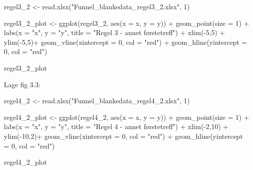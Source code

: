 \documentclass[
]{book}
\newenvironment{Shaded}{\begin{snugshade}}{\end{snugshade}}
\newcommand{\AttributeTok}[1]{\textcolor[rgb]{0.77,0.63,0.00}{#1}}
\newcommand{\DecValTok}[1]{\textcolor[rgb]{0.00,0.00,0.81}{#1}}
\newcommand{\FunctionTok}[1]{\textcolor[rgb]{0.00,0.00,0.00}{#1}}
\newcommand{\NormalTok}[1]{#1}
\newcommand{\OtherTok}[1]{\textcolor[rgb]{0.56,0.35,0.01}{#1}}
\newcommand{\SpecialCharTok}[1]{\textcolor[rgb]{0.00,0.00,0.00}{#1}}
\newcommand{\StringTok}[1]{\textcolor[rgb]{0.31,0.60,0.02}{#1}}
\begin{document}
\begin{Shaded}
\begin{Highlighting}[]
\NormalTok{regel3\_2 }\OtherTok{\textless{}{-}} \FunctionTok{read.xlsx}\NormalTok{(}\StringTok{"Funnel\_blankedata\_regel3\_2.xlsx"}\NormalTok{, }\DecValTok{1}\NormalTok{)}

\NormalTok{regel3\_2\_plot }\OtherTok{\textless{}{-}} \FunctionTok{ggplot}\NormalTok{(regel3\_2, }\FunctionTok{aes}\NormalTok{(}\AttributeTok{x =}\NormalTok{ x, }\AttributeTok{y =}\NormalTok{ y)) }\SpecialCharTok{+}
  \FunctionTok{geom\_point}\NormalTok{(}\AttributeTok{size =} \DecValTok{1}\NormalTok{) }\SpecialCharTok{+} \FunctionTok{labs}\NormalTok{(}\AttributeTok{x =} \StringTok{"x"}\NormalTok{, }\AttributeTok{y =} \StringTok{"y"}\NormalTok{, }\AttributeTok{title =} \StringTok{"Regel 3 {-} annet førstetreff"}\NormalTok{) }\SpecialCharTok{+} \FunctionTok{xlim}\NormalTok{(}\SpecialCharTok{{-}}\DecValTok{5}\NormalTok{,}\DecValTok{5}\NormalTok{) }\SpecialCharTok{+} \FunctionTok{ylim}\NormalTok{(}\SpecialCharTok{{-}}\DecValTok{5}\NormalTok{,}\DecValTok{5}\NormalTok{)}\SpecialCharTok{+} \FunctionTok{geom\_vline}\NormalTok{(}\AttributeTok{xintercept =} \DecValTok{0}\NormalTok{, }\AttributeTok{col =} \StringTok{"red"}\NormalTok{) }\SpecialCharTok{+} \FunctionTok{geom\_hline}\NormalTok{(}\AttributeTok{yintercept =} \DecValTok{0}\NormalTok{, }\AttributeTok{col =} \StringTok{"red"}\NormalTok{)}

\NormalTok{regel3\_2\_plot }
\end{Highlighting}
\end{Shaded}

Lage fig 3.3:

\begin{Shaded}
\begin{Highlighting}[]
\NormalTok{regel4\_2 }\OtherTok{\textless{}{-}} \FunctionTok{read.xlsx}\NormalTok{(}\StringTok{"Funnel\_blankedata\_regel4\_2.xlsx"}\NormalTok{, }\DecValTok{1}\NormalTok{)}

\NormalTok{regel4\_2\_plot }\OtherTok{\textless{}{-}} \FunctionTok{ggplot}\NormalTok{(regel4\_2, }\FunctionTok{aes}\NormalTok{(}\AttributeTok{x =}\NormalTok{ x, }\AttributeTok{y =}\NormalTok{ y)) }\SpecialCharTok{+}
  \FunctionTok{geom\_point}\NormalTok{(}\AttributeTok{size =} \DecValTok{1}\NormalTok{) }\SpecialCharTok{+} \FunctionTok{labs}\NormalTok{(}\AttributeTok{x =} \StringTok{"x"}\NormalTok{, }\AttributeTok{y =} \StringTok{"y"}\NormalTok{, }\AttributeTok{title =} \StringTok{"Regel 4 {-} annet førstetreff"}\NormalTok{) }\SpecialCharTok{+} \FunctionTok{xlim}\NormalTok{(}\SpecialCharTok{{-}}\DecValTok{2}\NormalTok{,}\DecValTok{10}\NormalTok{) }\SpecialCharTok{+} \FunctionTok{ylim}\NormalTok{(}\SpecialCharTok{{-}}\DecValTok{10}\NormalTok{,}\DecValTok{2}\NormalTok{)}\SpecialCharTok{+} \FunctionTok{geom\_vline}\NormalTok{(}\AttributeTok{xintercept =} \DecValTok{0}\NormalTok{, }\AttributeTok{col =} \StringTok{"red"}\NormalTok{) }\SpecialCharTok{+} \FunctionTok{geom\_hline}\NormalTok{(}\AttributeTok{yintercept =} \DecValTok{0}\NormalTok{, }\AttributeTok{col =} \StringTok{"red"}\NormalTok{)}

\NormalTok{regel4\_2\_plot}
\end{Highlighting}
\end{Shaded}
\end{document}
